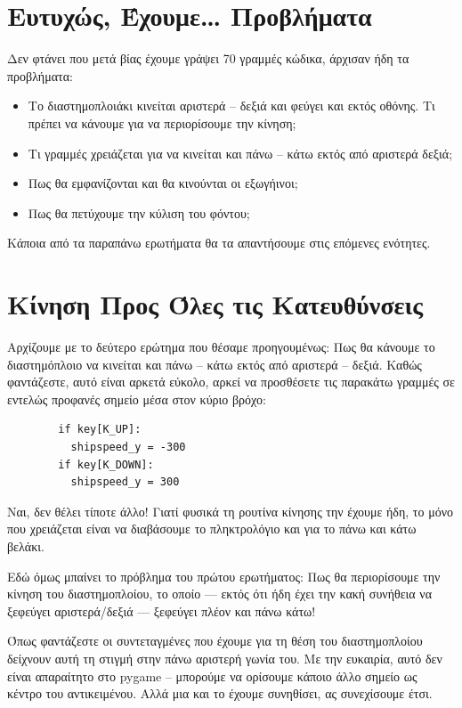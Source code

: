 \section{Ευτυχώς, Έχουμε\ldots{} Προβλήματα}

Δεν φτάνει που μετά βίας έχουμε γράψει 70 γραμμές κώδικα, άρχισαν ήδη τα προβλήματα:

\begin{itemize}
\item Το διαστημοπλοιάκι κινείται αριστερά -- δεξιά και φεύγει και εκτός
οθόνης. Τι πρέπει να κάνουμε για να περιορίσουμε την κίνηση;
\item Τι γραμμές χρειάζεται για να κινείται και πάνω -- κάτω εκτός από αριστερά δεξιά;
\item Πως θα εμφανίζονται και θα κινούνται οι εξωγήινοι;
\item Πως θα πετύχουμε την κύλιση του φόντου;
\end{itemize}

Κάποια από τα παραπάνω ερωτήματα θα τα απαντήσουμε στις επόμενες ενότητες.

\section{Κίνηση Προς Όλες τις Κατευθύνσεις}

Αρχίζουμε με το δεύτερο ερώτημα που θέσαμε προηγουμένως: Πως θα κάνουμε
το διαστημόπλοιο να κινείται και πάνω -- κάτω εκτός από αριστερά -- δεξιά.
Καθώς φαντάζεστε, αυτό είναι αρκετά εύκολο, αρκεί να προσθέσετε τις παρακάτω
γραμμές σε εντελώς προφανές σημείο μέσα στον κύριο βρόχο:

\begin{verbatim}
        if key[K_UP]:
          shipspeed_y = -300
        if key[K_DOWN]:
          shipspeed_y = 300
\end{verbatim}

Ναι, δεν θέλει τίποτε άλλο! Γιατί φυσικά τη ρουτίνα κίνησης την έχουμε ήδη,
το μόνο που χρειάζεται είναι να διαβάσουμε το πληκτρολόγιο και για το πάνω
και κάτω βελάκι.

Εδώ όμως μπαίνει το πρόβλημα του πρώτου ερωτήματος: Πως θα περιορίσουμε
την κίνηση του διαστημοπλοίου, το οποίο --- εκτός ότι ήδη έχει την κακή συνήθεια να ξεφεύγει αριστερά/δεξιά --- ξεφεύγει πλέον και πάνω κάτω!

Όπως φαντάζεστε οι συντεταγμένες που έχουμε για τη θέση του διαστημοπλοίου
δείχνουν αυτή τη στιγμή στην πάνω αριστερή γωνία του. Με την ευκαιρία, αυτό
δεν είναι απαραίτητο στο pygame -- μπορούμε να ορίσουμε κάποιο άλλο σημείο ως
κέντρο του αντικειμένου. Αλλά μια και το έχουμε συνηθίσει, ας συνεχίσουμε
έτσι.

